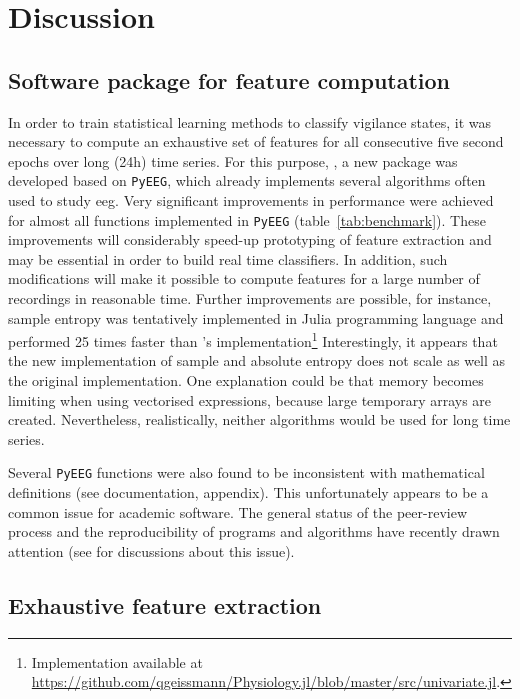 \section{Discussion} \label{discussion}

\subsection{Software package for feature computation}
 
In order to train statistical learning methods to classify vigilance states,
it was necessary to compute an exhaustive set of features for all consecutive five second epochs
over long (24h) time series.
For this purpose, \pr{}, a new \py{} package was developed based on
\texttt{PyEEG}\cite{bao_pyeeg:_2011},  which already implements several
algorithms often used to study \gls{eeg}.
Very significant improvements in performance were achieved for almost all functions implemented in \texttt{PyEEG}
(table~\ref{tab:benchmark}). These improvements will considerably speed-up prototyping of feature extraction
and may be essential in order to build real time classifiers.
In addition, such modifications will make it possible to compute features for a large number
of recordings in reasonable time.
Further improvements are possible, for instance,
sample entropy was tentatively implemented in Julia programming language\cite{bezanson_julia:_2012}
and performed 25 times faster than \pr{}'s implementation\footnote{Implementation available at
\href{https://github.com/qgeissmann/Physiology.jl/blob/master/src/univariate.jl}{https://github.com/qgeissmann/Physiology.jl/blob/master/src/univariate.jl}.}
Interestingly, it appears that the new implementation of sample and
absolute entropy does not scale as well as the original implementation.
One explanation could be that memory becomes limiting when using vectorised expressions, because large temporary arrays are created.
Nevertheless, realistically, neither algorithms would be used for long time series.

Several \texttt{PyEEG} functions were also found to be inconsistent with mathematical
definitions (see \pr{} documentation, appendix).
This unfortunately appears to be a common issue for academic software.
The general status of the peer-review process and the reproducibility of programs and algorithms have
recently drawn attention (see \cite{morin_shining_2012,crick_can_2014} for
discussions about this issue).

\subsection{Exhaustive feature extraction}

